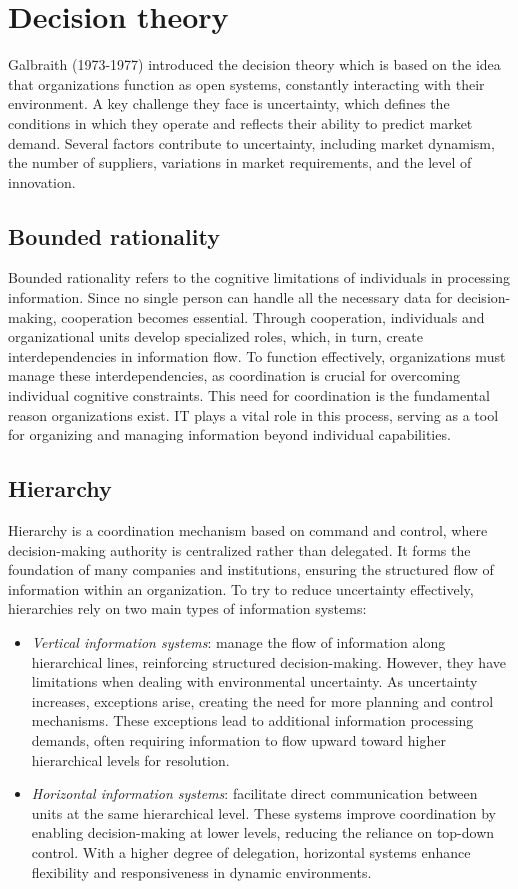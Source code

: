 \section{Decision theory}

Galbraith (1973-1977) introduced the decision theory which is based on the idea that organizations function as open systems, constantly interacting with their environment. 
A key challenge they face is uncertainty, which defines the conditions in which they operate and reflects their ability to predict market demand. 
Several factors contribute to uncertainty, including market dynamism, the number of suppliers, variations in market requirements, and the level of innovation.

\subsection{Bounded rationality}
Bounded rationality refers to the cognitive limitations of individuals in processing information. 
Since no single person can handle all the necessary data for decision-making, cooperation becomes essential. 
Through cooperation, individuals and organizational units develop specialized roles, which, in turn, create interdependencies in information flow. 
To function effectively, organizations must manage these interdependencies, as coordination is crucial for overcoming individual cognitive constraints. 
This need for coordination is the fundamental reason organizations exist. 
IT plays a vital role in this process, serving as a tool for organizing and managing information beyond individual capabilities.

\subsection{Hierarchy}
Hierarchy is a coordination mechanism based on command and control, where decision-making authority is centralized rather than delegated. 
It forms the foundation of many companies and institutions, ensuring the structured flow of information within an organization. 
To try to reduce uncertainty effectively, hierarchies rely on two main types of information systems: 
\begin{itemize}
    \item \textit{Vertical information systems}: manage the flow of information along hierarchical lines, reinforcing structured decision-making. 
        However, they have limitations when dealing with environmental uncertainty. 
        As uncertainty increases, exceptions arise, creating the need for more planning and control mechanisms. 
        These exceptions lead to additional information processing demands, often requiring information to flow upward toward higher hierarchical levels for resolution.
    \item \textit{Horizontal information systems}: facilitate direct communication between units at the same hierarchical level.
        These systems improve coordination by enabling decision-making at lower levels, reducing the reliance on top-down control. 
        With a higher degree of delegation, horizontal systems enhance flexibility and responsiveness in dynamic environments.
\end{itemize}

